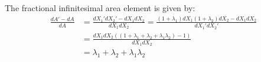 \documentclass{article}
\begin{document}
\begin{comment}
\begin{align*}
    S &= \begin{pmatrix}
        \frac{\partial u_1}{\partial x} & \frac{1}{2}\left(\frac{\partial u_1}{\partial y} + \frac{\partial u_2}{\partial x}\right) & \frac{1}{2}\left(\frac{\partial u_1 }{\partial z} + \frac{\partial u_3}{\partial x}\right)\\
        \frac{1}{2}\left(\frac{\partial u_2}{\partial x} + \frac{\partial u_1}{\partial y}\right) & \frac{\partial u_2}{\partial y} & \frac{1}{2}\left(\frac{\partial u_2}{\partial z} + \frac{\partial u_3}{\partial y}\right)\\
        \frac{1}{2}\left(\frac{\partial u_3}{\partial x}+\frac{\partial u_1}{\partial z}\right) & \frac{1}{2}\left(\frac{\partial u_3}{\partial y} + \frac{\partial u_2}{\partial z}\right) & \frac{\partial u_3}{\partial z}
    \end{pmatrix}\\
    &= \sum_{\alpha, \beta}\frac{1}{2}\left(\frac{\partial u_\alpha}{\partial \beta} + \frac{\partial u_\beta}{\partial \alpha}\right)
\end{align*}Looking at the $x-y$-plane gives the following determinant:
\begin{align*}
    \text{det}(S_z) &=\begin{vmatrix}
        \frac{\partial u_1}{\partial x} & \frac{1}{2}\left(\frac{\partial u_1}{\partial y} + \frac{\partial u_2}{\partial x}\right)\\
        \frac{1}{2}\left(\frac{\partial u_2}{\partial x} + \frac{\partial u_1}{\partial y}\right)& \frac{\partial u_2}{\partial y}\\
    \end{vmatrix}\\
    &= \frac{\partial u_1}{\partial x}\frac{\partial u_2}{\partial y} - \frac{1}{4}\left(\frac{\partial u_1}{\partial y} + \frac{\partial u_2}{\partial x}\right)^2\\
    &= \frac{\partial u_1}{\partial x}\frac{\partial u_2}{\partial y} - \frac{1}{4}\left(\frac{\partial u_1}{\partial y}\right)^2 - \frac{1}{4}\left(\frac{\partial u_2}{\partial x}\right)^2 - \frac{1}{2}\frac{\partial u_1}{\partial y}\frac{\partial u_2}{\partial x}\\
\end{align*}
\end{comment}
The fractional infinitesimal area element is given by:
\begin{align*}
    \frac{dA' - dA}{dA} &= \frac{dX_1'dX_2' - dX_1dX_2}{dX_1dX_2} = \frac{(1+\lambda_1)dX_1(1+\lambda_2)dX_2 - dX_1dX_2}{dX_1'dX_2'}\\
    &=\frac{dX_1dX_2\left((1 + \lambda_1 + \lambda_2 + \lambda_1\lambda_2)-1\right)}{dX_1dX_2}\\
    &= \lambda_1+\lambda_2 + \lambda_1\lambda_2
\end{align*}
\end{document}
